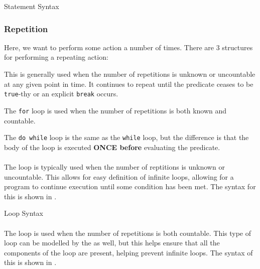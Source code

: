 \begin{listing}[h!tbp]
\caption{\texorpdfstring{}{\texttt{switch case}} Statement Syntax}
\label{lst:switch_case_Statement}
\end{listing}

\subsubsection{Repetition}\label{subsubsec:Repetition}
Here, we want to perform some action a number of times.
There are 3 structures for performing a repeating action:
\begin{description}[noitemsep]
\item[\nameref{par:while_Loop} Loop] This is generally used when the number of repetitions is unknown or uncountable at any given point in time.
  It continues to repeat until the predicate ceases to be \texttt{true}-thy or an explicit \texttt{break} occurs.

\item[\nameref{par:for_Loop} Loop] The \texttt{for} loop is used when the number of repetitions is both known and countable.

\item[\nameref{par:dowhile_Loop} Loop] The \texttt{do while} loop is the same as the \texttt{while} loop, but the difference is that the body of the loop is executed \textbf{ONCE before} evaluating the predicate.
\end{description}

\paragraph{\texorpdfstring{}{\texttt{while}}}\label{par:while_Loop}
The  loop is typically used when the number of reptitions is unknown or uncountable.
This allows for easy definition of infinite loops, allowing for a program to continue execution until some condition has been met.
The syntax for this is shown in .

\begin{listing}[h!tbp]
\caption{\texorpdfstring{}{\texttt{while}} Loop Syntax}
\label{lst:while_Loop}
\end{listing}

\paragraph{\texorpdfstring{}{\texttt{for}}}\label{par:for_Loop}
The  loop is used when the number of repetitions is both countable.
This type of loop can be modelled by the  as well, but this helps ensure that all the components of the loop are present, helping prevent infinite loops.
The syntax of this is shown in .

